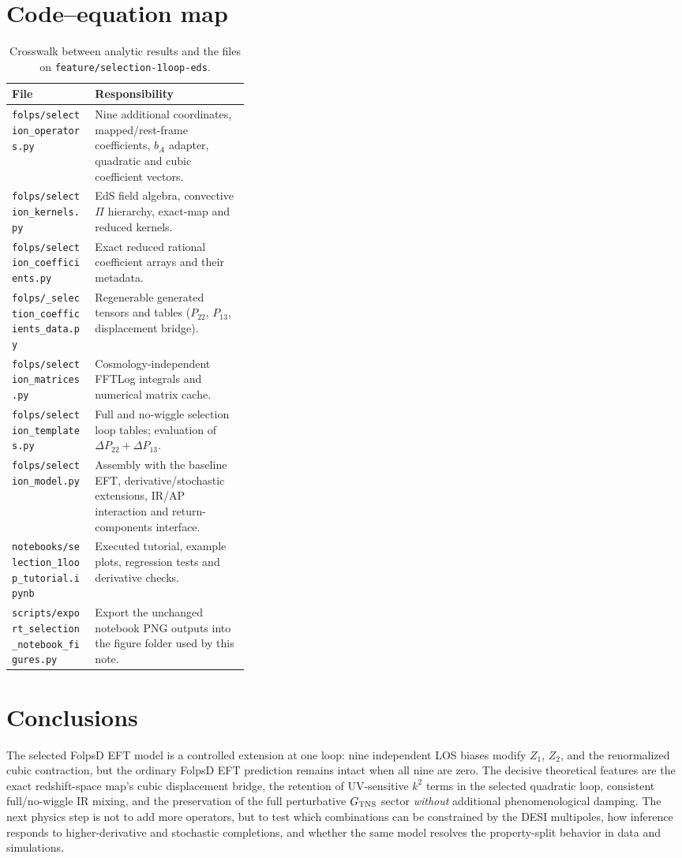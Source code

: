 \documentclass[11pt,a4paper]{article}
\begin{document}
\section{Code--equation map}
\begin{table}[htbp]\small\centering
\begin{tabularx}{\linewidth}{@{}p{0.35\linewidth}X@{}}\toprule
File & Responsibility\\\midrule
\texttt{folps/selection\_operators.py} & Nine additional coordinates, mapped/rest-frame coefficients, $b_A$ adapter, quadratic and cubic coefficient vectors.\\
\texttt{folps/selection\_kernels.py} & EdS field algebra, convective $\Pi$ hierarchy, exact-map and reduced kernels.\\
\texttt{folps/selection\_coefficients.py} & Exact reduced rational coefficient arrays and their metadata.\\
\texttt{folps/\_selection\_coefficients\_data.py} & Regenerable generated tensors and tables ($P_{22}$, $P_{13}$, displacement bridge).\\
\texttt{folps/selection\_matrices.py} & Cosmology-independent FFTLog integrals and numerical matrix cache.\\
\texttt{folps/selection\_templates.py} & Full and no-wiggle selection loop tables; evaluation of $\Delta P_{22}+\Delta P_{13}$.\\
\texttt{folps/selection\_model.py} & Assembly with the baseline EFT, derivative/stochastic extensions, IR/AP interaction and return-components interface.\\
\texttt{notebooks/selection\_1loop\_tutorial.ipynb} & Executed tutorial, example plots, regression tests and derivative checks.\\
\texttt{scripts/export\_selection\_notebook\_figures.py} & Export the unchanged notebook PNG outputs into the figure folder used by this note.\\\bottomrule
\end{tabularx}
\caption{Crosswalk between analytic results and the files on \texttt{feature/selection-1loop-eds}.}\label{tab:map}
\end{table}

\section{Conclusions}
The selected FolpsD EFT model is a controlled extension at one loop: nine independent LOS biases modify $Z_1$, $Z_2$, and the renormalized cubic contraction, but the ordinary FolpsD EFT prediction remains intact when all nine are zero. The decisive theoretical features are the exact redshift-space map's cubic displacement bridge, the retention of UV-sensitive $k^2$ terms in the selected quadratic loop, consistent full/no-wiggle IR mixing, and the preservation of the full perturbative $G_{\rm TNS}$ sector \emph{without} additional phenomenological damping. The next physics step is not to add more operators, but to test which combinations can be constrained by the DESI multipoles, how inference responds to higher-derivative and stochastic completions, and whether the same model resolves the property-split behavior in data and simulations.
\end{document}
